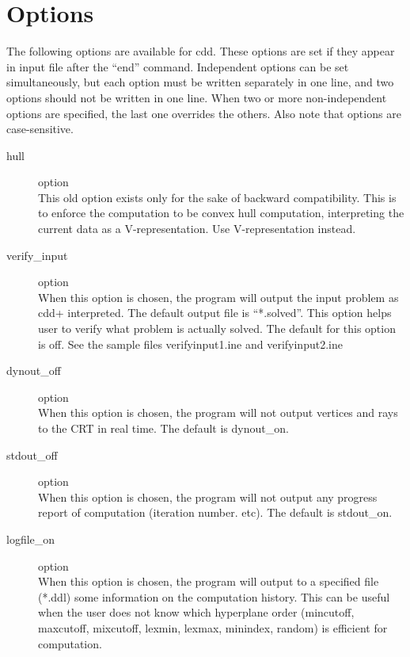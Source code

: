 \documentclass[11pt]{article}
\begin{document}
\section{Options}  \label{OPTIONS}

The following options are available for cdd.  These options are
set if they appear in input file after the ``end'' command.
Independent options can be set simultaneously, but each option
must be written separately in one line, and  two options
should not be written in one line.  When two or more non-independent
options are specified, the last one overrides the others.
Also note that options are case-sensitive.

\begin{description}

\item[hull] option \\
This old option exists only for the sake of
backward compatibility.  This is to enforce
the computation to be convex hull computation,
interpreting the current data as a V-representation.
Use V-representation instead.

\item[verify\_input] option\\
When this option is chosen, the program will
output the input problem as cdd+ interpreted.  
The default output  file is ``*.solved''. 
This option helps user to verify what problem
is actually solved.  The default for this option is off.
See the sample files verifyinput1.ine and verifyinput2.ine

\item[dynout\_off] option\\
When this option is chosen, the program will
not output vertices and rays to the CRT in real time.  
The default is dynout\_on.

\item[stdout\_off] option\\
 When this option is chosen, the program will not
output any progress report of computation (iteration number. etc).
The default is stdout\_on.

\item[logfile\_on] option\\
 When this option is chosen, the program will output
to a specified file (*.ddl) some information on the computation history.
This can be useful when the user does not know which hyperplane order
(mincutoff, maxcutoff, mixcutoff, lexmin, lexmax, minindex, random)
is efficient for computation.


\end{description}
\end{document}
